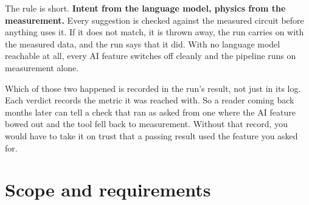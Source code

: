 \documentclass[11pt,a4paper]{article}
\begin{document}
The rule is short. \textbf{Intent from the language model, physics from
the measurement.} Every suggestion is checked against the measured
circuit before anything uses it. If it does not match, it is thrown
away, the run carries on with the measured data, and the run says that
it did. With no language model reachable at all, every AI feature
switches off cleanly and the pipeline runs on measurement alone.

Which of those two happened is recorded in the run's result, not just
in its log. Each verdict records the metric it was reached with. So a
reader coming back months later can tell a check that ran as asked
from one where the AI feature bowed out and the tool fell back to
measurement. Without that record, you would have to take it on trust
that a passing result used the feature you asked for.

\section{Scope and requirements}
\end{document}
